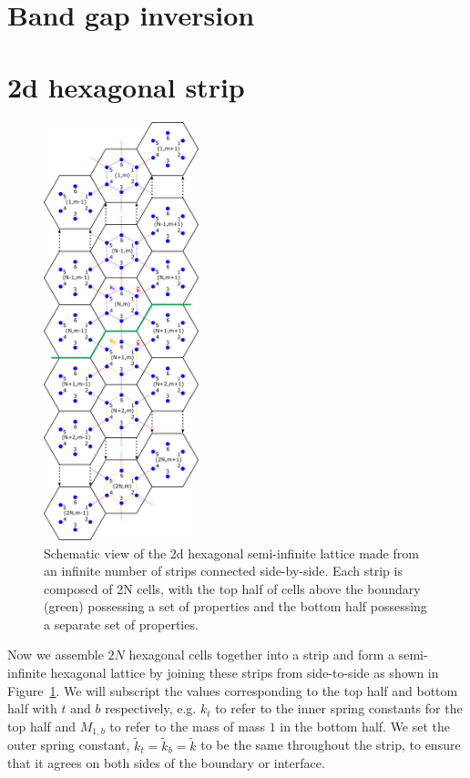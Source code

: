 \section{Band gap inversion}

\section{2d hexagonal strip}
\label{formstrip}

\begin{figure}[!h]
\centering
\includegraphics[width=0.4\textwidth]{imgs/hexstripmodel.png}
\caption{\label{fig:hexstripmodel} Schematic view of the 2d hexagonal
  semi-infinite lattice made from an infinite number of strips connected
  side-by-side. Each strip is composed of 2N cells, with the top half of cells
  above the boundary (green) possessing a set of properties and the bottom half
  possessing a separate set of properties.}
\end{figure}

Now we assemble $2N$ hexagonal cells together into a strip and form a
semi-infinite hexagonal lattice by joining these strips from side-to-side as
shown in Figure~\ref{fig:hexstripmodel}. We will subscript the values
corresponding to the top half and bottom half with $t$ and $b$ respectively,
e.g. $k_t$ to refer to the inner spring constants for the top half and
$M_{1,b}$ to refer to the mass of mass $1$ in the bottom half. We set the outer
spring constant, $\tilde{k}_t=\tilde{k}_b=\tilde{k}$ to be the same throughout
the strip, to ensure that it agrees on both sides of the boundary or interface.

